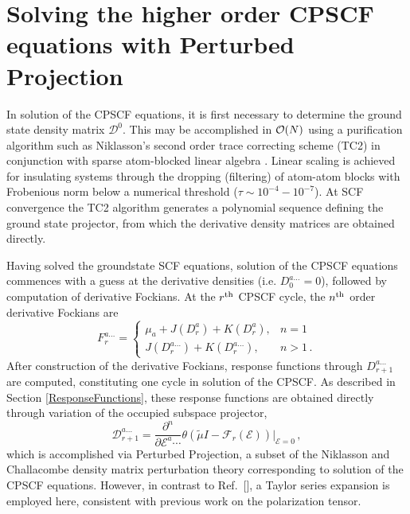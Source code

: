 \documentclass[prl,twocolumn,showpacs,twocolumngrid,superbib]{revtex4}
\def\F{\mathcal{F}}
\def\D{\mathcal{D}}
\def\E{\mathcal{E}}
\begin{document}
\section{Solving the higher order CPSCF equations with Perturbed Projection}

In solution of the CPSCF equations, it is first necessary to determine the ground state density matrix $\mathcal{D}^0$.  This may 
be accomplished in ${\cal O}(N)$ using a purification algorithm such as Niklasson's \cite{ANiklasson02A} 
second order trace correcting scheme (TC2) in conjunction with sparse atom-blocked linear algebra 
\cite{ANiklasson03,MChallacombe00B}.  Linear scaling is achieved for insulating systems through 
the dropping (filtering) of atom-atom blocks with Frobenious norm below a numerical threshold 
($\tau \sim 10^{-4}-10^{-7}$).  At SCF convergence the TC2 algorithm generates a polynomial sequence 
defining the ground state projector, from which the derivative density matrices are obtained directly.

Having solved the groundstate SCF equations, solution of the CPSCF equations commences with a guess at the 
derivative densities (i.e. $D^{a\ldots}_0=0$), followed by computation of derivative Fockians.  At the $r^{\rm th}$ 
CPSCF cycle, the $n^{\rm th}$ order derivative Fockians are 
\begin{equation}
    F^{a\ldots}_{r}= \left\{
    \begin{array}{ll}
      \mu_a+J(D^{a}_r)+K(D^{a}_r), & n=1\label{FockBuild}\\
      J(D^{a\ldots}_r)+K(D^{a\ldots}_r), & n>1 \,.
    \end{array}\right.
\end{equation}
After construction of the derivative Fockians, response functions through 
$D^{a\ldots}_{r+1}$ are computed, constituting one cycle in solution of the CPSCF.  
As described in Section \ref{ResponseFunctions},  these response functions are 
obtained directly through variation of the occupied subspace projector,  
\begin{equation}
    \displaystyle\D^{a\ldots}_{r+1}=
    \frac{\partial^n}{\partial\E^{a}\cdots}\theta(\tilde{\mu}I-
    \F_r(\E))\bigg|_{\E=0} \, , \label{DDeriv}
\end{equation}
which is accomplished via Perturbed Projection, a subset of the Niklasson and 
Challacombe density matrix perturbation theory \cite{ANiklasson04} 
corresponding to solution of the CPSCF equations.  However, in contrast
to Ref.~[], a Taylor series expansion is employed here,
consistent with previous work on the polarization tensor.
\end{document}
